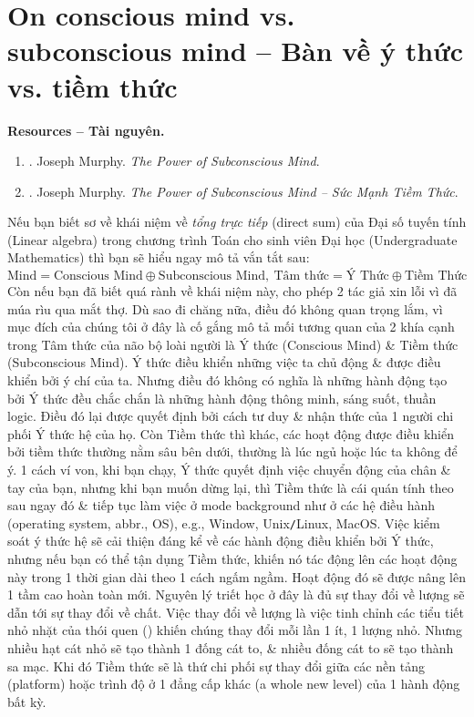 \documentclass[12pt,twoside]{book}
\begin{document}
\section{On conscious mind vs. subconscious mind -- Bàn về ý thức vs. tiềm thức}
{\bf \textsf{Resources -- Tài nguyên.}}
\begin{enumerate}
	\item \cite{Murphy_subconscious}. {\sc Joseph Murphy}. {\it The Power of Subconscious Mind}.
	\item \cite{Murphy_subconscious_VN}. {\sc Joseph Murphy}. {\it The Power of Subconscious Mind -- Sức Mạnh Tiềm Thức}.
\end{enumerate}
Nếu bạn biết sơ về khái niệm về {\it tổng trực tiếp} (direct sum) của Đại số tuyến tính (Linear algebra) trong chương trình Toán cho sinh viên Đại học (Undergraduate Mathematics) thì bạn sẽ hiểu ngay mô tả vắn tắt sau:
\begin{equation}
	\label{conscious + subconscious}
	\tag{mind}
	\boxed{\mbox{Mind} = \mbox{Conscious Mind}\oplus\mbox{Subconscious Mind},\ \mbox{Tâm thức} = \mbox{Ý Thức}\oplus\mbox{Tiềm Thức}}
\end{equation}
Còn nếu bạn đã biết quá rành về khái niệm này, cho phép 2 tác giả xin lỗi vì đã múa rìu qua mắt thợ. Dù sao đi chăng nữa, điều đó không quan trọng lắm, vì mục đích của chúng tôi ở đây là cố gắng mô tả mối tương quan của 2 khía cạnh trong Tâm thức của não bộ loài người là Ý thức (Conscious Mind) \& Tiềm thức (Subconscious Mind). Ý thức điều khiển những việc ta chủ động \& được điều khiển bởi ý chí của ta. Nhưng điều đó không có nghĩa là những hành động tạo bởi Ý thức đều chắc chắn là những hành động thông minh, sáng suốt, thuần logic. Điều đó lại được quyết định bởi cách tư duy \& nhận thức của 1 người chi phối Ý thức hệ của họ. Còn Tiềm thức thì khác, các hoạt động được điều khiển bởi tiềm thức thường nằm sâu bên dưới, thường là lúc ngủ hoặc lúc ta không để ý. 1 cách ví von, khi bạn chạy, Ý thức quyết định việc chuyển động của chân \& tay của bạn, nhưng khi bạn muốn dừng lại, thì Tiềm thức là cái quán tính theo sau ngay đó \& tiếp tục làm việc ở mode background như ở các hệ điều hành (operating system, abbr., OS), e.g., Window, Unix{\tt/}Linux, MacOS. Việc kiểm soát ý thức hệ sẽ cải thiện đáng kể về các hành động điều khiển bởi Ý thức, nhưng nếu bạn có thể tận dụng Tiềm thức, khiến nó tác động lên các hoạt động này trong 1 thời gian dài theo 1 cách ngấm ngầm. Hoạt động đó sẽ được nâng lên 1 tầm cao hoàn toàn mới. Nguyên lý triết học ở đây là đủ sự thay đổi về lượng sẽ dẫn tới sự thay đổi về chất. Việc thay đổi về lượng là việc tinh chỉnh các tiểu tiết nhỏ nhặt của thói quen (\cite{Clear_habit,Clear_habit_VN,Duhigg_habit,Duhigg_habit_VN}) khiến chúng thay đổi mỗi lần 1 ít, 1 lượng nhỏ. Nhưng nhiều hạt cát nhỏ sẽ tạo thành 1 đống cát to, \& nhiều đống cát to sẽ tạo thành sa mạc. Khi đó Tiềm thức sẽ là thứ chi phối sự thay đổi giữa các nền tảng (platform) hoặc trình độ ở 1 đẳng cấp khác (a whole new level) của 1 hành động bất kỳ.
\end{document}
